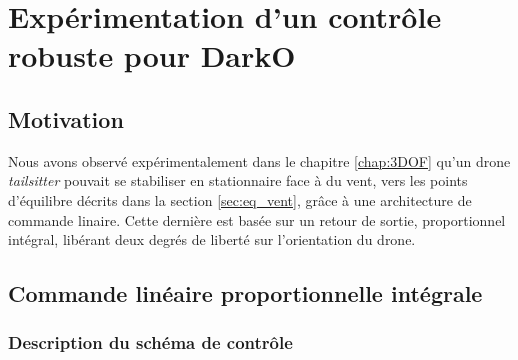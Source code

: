 \chapter{Expérimentation d'un contrôle robuste pour DarkO}
\minitoc
\label{chap:6DOF}

\section{Motivation}
\label{sec:motivation6DOF}
Nous avons observé expérimentalement dans le chapitre \ref{chap:3DOF} qu'un drone \textit{tailsitter} pouvait se stabiliser en stationnaire face à du vent, vers les points d'équilibre décrits dans la section \ref{sec:eq_vent}, grâce à une architecture de commande linaire. Cette dernière est basée sur un retour de sortie, proportionnel intégral, libérant deux degrés de liberté sur l'orientation du drone.


\section{Commande linéaire proportionnelle intégrale}
\label{sec:6dofcmd}
\subsection{Description du schéma de contrôle}
\label{sec:ctl_sche}


